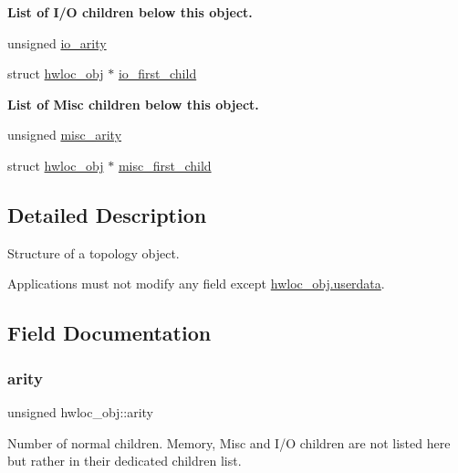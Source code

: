 \begin{Indent}\textbf{ List of I/O children below this object.}\par
\begin{DoxyCompactItemize}
\item 
unsigned \hyperlink{a00238_a7b3b29f0be377c7d2d52262019fc7d11}{io\+\_\+arity}
\item 
struct \hyperlink{a00238}{hwloc\+\_\+obj} $\ast$ \hyperlink{a00238_a8d14c88e1ebc4ae67cc69f9e928558b3}{io\+\_\+first\+\_\+child}
\end{DoxyCompactItemize}
\end{Indent}
\begin{Indent}\textbf{ List of Misc children below this object.}\par
\begin{DoxyCompactItemize}
\item 
unsigned \hyperlink{a00238_a2bb7862ce722d7ceda23cfa153da165a}{misc\+\_\+arity}
\item 
struct \hyperlink{a00238}{hwloc\+\_\+obj} $\ast$ \hyperlink{a00238_a57812a313fe9b1a9500489f47c3011cc}{misc\+\_\+first\+\_\+child}
\end{DoxyCompactItemize}
\end{Indent}


\subsection{Detailed Description}
Structure of a topology object. 

Applications must not modify any field except {\ttfamily \hyperlink{a00238_a76fd3ac94401cf32dfccc3a3a8de68a5}{hwloc\+\_\+obj.\+userdata}}. 

\subsection{Field Documentation}
\mbox{\label{a00238_aac3f6da35c9b57599909a44ce2b716c1}} 
\subsubsection{\texorpdfstring{arity}{arity}}
{\footnotesize\ttfamily unsigned hwloc\+\_\+obj\+::arity}



Number of normal children. Memory, Misc and I/O children are not listed here but rather in their dedicated children list. 

